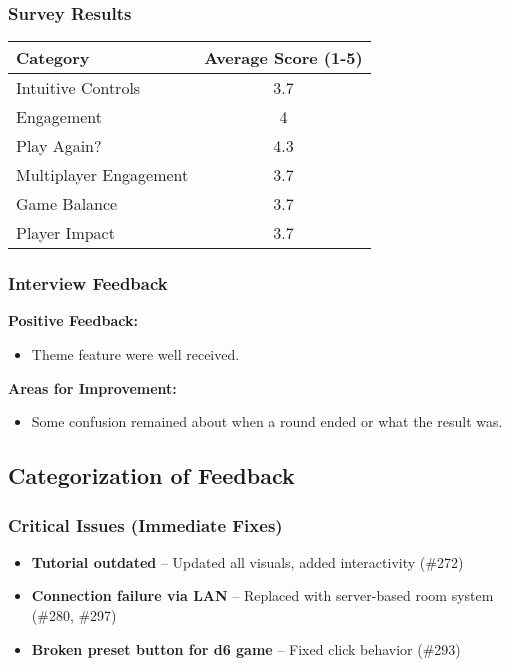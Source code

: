 \documentclass[12pt, titlepage]{article}
\begin{document}
\subsubsection{Survey Results}
\begin{longtable}{|p{7cm}|c|}
\hline
\textbf{Category} & \textbf{Average Score (1-5)} \\
\hline
Intuitive Controls & 3.7 \\
\hline
Engagement & 4 \\
\hline
Play Again? & 4.3 \\
\hline
Multiplayer Engagement & 3.7 \\
\hline
Game Balance & 3.7 \\
\hline
Player Impact & 3.7 \\
\hline
\end{longtable}

\subsubsection{Interview Feedback}

\textbf{Positive Feedback:}
\begin{itemize}
    \item Theme feature were well received.
\end{itemize}

\textbf{Areas for Improvement:}
\begin{itemize}
    \item Some confusion remained about when a round ended or what the result was.
\end{itemize}


\subsection{Categorization of Feedback}

\subsubsection{Critical Issues (Immediate Fixes)}
\begin{itemize}
    \item \textbf{Tutorial outdated} – Updated all visuals, added interactivity (\#272)
    \item \textbf{Connection failure via LAN} – Replaced with server-based room system (\#280, \#297)
    \item \textbf{Broken preset button for d6 game} – Fixed click behavior (\#293)
\end{itemize}
\end{document}

